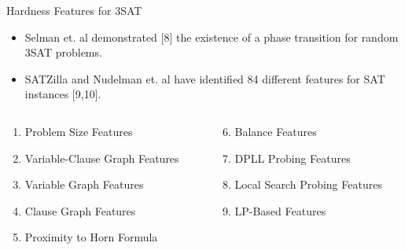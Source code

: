 \documentclass[
  ignorenonframetext,
]{beamer}
\providecommand{\tightlist}{%
  \setlength{\itemsep}{0pt}\setlength{\parskip}{0pt}}
\begin{document}
\begin{frame}{Hardness Features for 3SAT}
\protect\hypertarget{hardness-features-for-3sat}{}

\begin{itemize}[<+->]
\tightlist
\item
  Selman et. al demonstrated {[}8{]} the existence of a phase transition
  for random 3SAT problems.
\item
  SATZilla and Nudelman et. al have identified 84 different features for
  SAT instances {[}9,10{]}.
\end{itemize}

\pause

\begin{columns}[T]
\begin{column}{0.5\textwidth}
\small

\begin{enumerate}
\tightlist
\item
  Problem Size Features
\item
  Variable-Clause Graph Features
\item
  Variable Graph Features
\item
  Clause Graph Features
\item
  Proximity to Horn Formula
\end{enumerate}
\end{column}

\begin{column}{0.5\textwidth}
\pause
\small

\begin{enumerate}
\setcounter{enumi}{5}
\tightlist
\item
  Balance Features
\item
  DPLL Probing Features
\item
  Local Search Probing Features
\item
  LP-Based Features
\end{enumerate}
\end{column}
\end{columns}

\end{frame}
\end{document}
